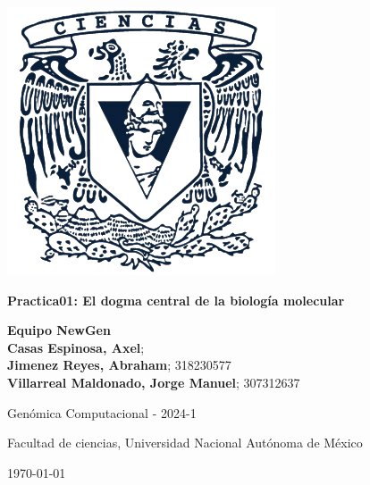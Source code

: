 \hfill
\begin{minipage}{0.18\textwidth}
    \includegraphics[width=\textwidth]{figuras/facultad-de-ciencias.png} %
\end{minipage}
\hspace{25pt}
\begin{minipage}{0.75\textwidth}

    \Large{\textbf{Practica01: El dogma central de la biología molecular}} %
    \vspace{4mm}
    
    \large{\textbf{Equipo NewGen}}\\
    \large{\textbf{Casas Espinosa, Axel};} \\
    \large{\textbf{Jimenez Reyes, Abraham}; 318230577 } \\
    \large{\textbf{Villarreal Maldonado, Jorge Manuel}; 307312637}
    \vspace{2mm}
    
    Genómica Computacional - 2024-1 
    
    Facultad de ciencias, Universidad Nacional Autónoma de México 
    \vspace{1mm} 
    
    \today %

\end{minipage}